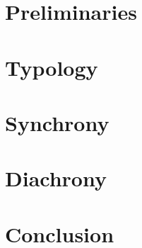 \documentclass[output=book            %
	        ,table
		,nonflat
		,modfonts
		  ]{langsci/langscibook}
\begin{document}
   
\maketitle                

\frontmatter%

\tableofcontents      




\mainmatter         
\part{Preliminaries}\label{part:theory} %



\part{Typology} \label{part typ} %


\part{Synchrony} \label{part synchr} %



\part{Diachrony} \label{part diachr} %


\part{Conclusion}\label{part:concl} %

\end{document}
